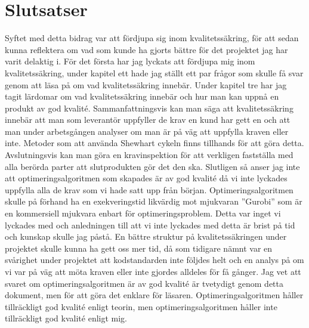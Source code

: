 \section{Slutsatser}
Syftet med detta bidrag var att fördjupa sig inom kvalitetssäkring, för att sedan kunna reflektera om vad som kunde ha gjorts bättre för det projektet jag har varit delaktig i.
\newline
\newline
För det första har jag lyckats att fördjupa mig inom kvalitetssäkring, under kapitel ett hade jag ställt ett par frågor som skulle få svar genom att läsa på om vad kvalitetssäkring innebär. Under kapitel tre har jag tagit lärdomar om vad kvalitetssäkring innebär och hur man kan uppnå en produkt av god kvalité. Sammanfattningsvis kan man säga att kvalitetssäkring innebär att man som leverantör uppfyller de krav en kund har gett en och att man under arbetsgången analyser om man är på väg att uppfylla kraven eller inte. Metoder som att använda Shewhart cykeln finns tillhands för att göra detta. Avslutningsvis kan man göra en kravinspektion för att verkligen fastställa med alla berörda parter att slutprodukten gör det den ska.
\newline
\newline
Slutligen så anser jag inte att optimeringsalgoritmen som skapades är av god kvalité då vi inte lyckades uppfylla alla de krav som vi hade satt upp från början. Optimeringsalgoritmen skulle på förhand ha en exekveringstid likvärdig mot mjukvaran ''Gurobi'' som är en kommersiell mjukvara enbart för optimeringsproblem. Detta var inget vi lyckades med och anledningen till att vi inte lyckades med detta är brist på tid och kunskap skulle jag påstå. En bättre struktur på kvalitetssäkringen under projektet skulle kunna ha gett oss mer tid, då som tidigare nämnt var en svårighet under projektet att kodstandarden inte följdes helt och en analys på om vi var på väg att möta kraven eller inte gjordes alldeles för få gånger. Jag vet att svaret om optimeringsalgoritmen är av god kvalité är tvetydigt genom detta dokument, men för att göra det enklare för läsaren. Optimeringsalgoritmen håller tillräckligt god kvalité enligt teorin, men optimeringsalgoritmen håller inte tillräckligt god kvalité enligt mig.
